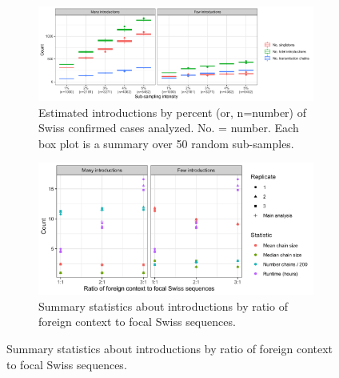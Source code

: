\documentclass[9pt,twoside,lineno]{pnas-new}
\begin{document}
\begin{figure}[h!]
\centering
\begin{subfigure}[b]{\textwidth}
\centering
\includegraphics[width = 11.4cm]{figures/fig_SX_sensitivity_subsampling.png}
\caption{Estimated introductions by percent (or, n=number) of Swiss confirmed cases analyzed. No. = number. Each box plot is a summary over 50 random sub-samples.}  
\end{subfigure}

\begin{subfigure}[b]{0.9\textwidth}
\centering
\includegraphics[width = 11.4cm]{figures/fig_SX_sensitivity_context_set_size.png}
\caption{Summary statistics about introductions by ratio of foreign context to focal Swiss sequences.}  
\end{subfigure}


\end{figure}
\end{document}
